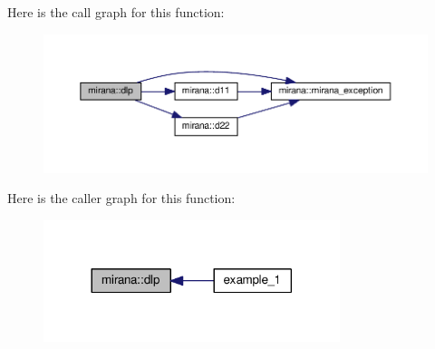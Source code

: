 Here is the call graph for this function\+:\nopagebreak
\begin{figure}[H]
\begin{center}
\leavevmode
\includegraphics[width=350pt]{namespacemirana_a353bce8a93046cd8fd25021634d6503e_cgraph}
\end{center}
\end{figure}




Here is the caller graph for this function\+:\nopagebreak
\begin{figure}[H]
\begin{center}
\leavevmode
\includegraphics[width=245pt]{namespacemirana_a353bce8a93046cd8fd25021634d6503e_icgraph}
\end{center}
\end{figure}


\hypertarget{namespacemirana_a7530ea2e7b2dfe85f3a088d24de59f1d}{}
